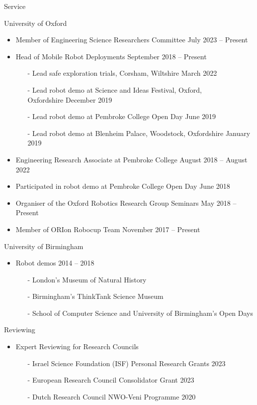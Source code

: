 \begin{rSection}{Service}
\item University of Oxford
\begin{itemize}
\item Member of Engineering Science Researchers Committee \hfill July 2023 -- Present
\item Head of Mobile Robot Deployments \hfill  September 2018 -- Present
\begin{itemize}
\item[-] Lead safe exploration trials, Corsham, Wiltshire \hfill March 2022
\item[-]  Lead robot demo at Science and Ideas Festival, Oxford, \\ Oxfordshire \hfill December 2019
\item[-]  Lead robot demo at Pembroke College Open Day \hfill June 2019
\item[-]  Lead robot demo at Blenheim Palace, Woodstock, Oxfordshire \hfill January 2019
\end{itemize}
\item Engineering Research Associate at Pembroke College \hfill August 2018 -- August 2022
\item Participated in robot demo at Pembroke College Open Day \hfill June 2018
\item Organiser of the Oxford Robotics Research Group Seminars \hfill May 2018 -- Present
\item Member of ORIon Robocup Team \hfill November 2017 -- Present
\end{itemize}


\item University of Birmingham
\begin{itemize}
\item Robot demos  \hfill 2014 -- 2018
\begin{itemize}
\item[-] London's  Museum of Natural History
\item[-]Birmingham's ThinkTank Science Museum
\item[-] School of  Computer Science and University of Birmingham's Open Days 
\end{itemize}
\end{itemize}


\item Reviewing
\begin{itemize}
\item Expert Reviewing for Research Councils
\begin{itemize}
\item[-] Israel Science Foundation (ISF) Personal Research Grants  \hfill 2023
\item[-] European Research Council Consolidator Grant \hfill 2023
\item[-] Dutch Research Council NWO-Veni Programme  \hfill 2020
\end{itemize}



\end{itemize}
\end{rSection}
